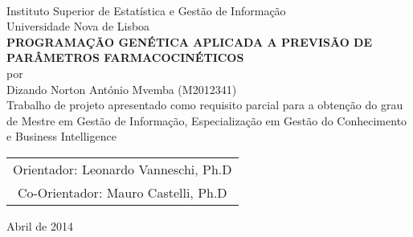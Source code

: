\setcounter{page}{1} 


\thispagestyle{empty}
~\\ \vspace{5mm}
\begin{centering}
\normalsize Instituto Superior de Estatística e Gestão de Informação\\
\normalsize Universidade Nova de Lisboa
\\ \vspace{30mm}
\large \textbf{PROGRAMAÇÃO GENÉTICA APLICADA A PREVISÃO DE PARÂMETROS FARMACOCINÉTICOS}
\\ \vspace{10mm}
\normalsize por
\\ \vspace{10mm}
\large Dizando Norton António Mvemba (M2012341) %
\\ \vspace{30mm}
\normalsize Trabalho de projeto apresentado como requisito parcial para a obtenção do grau de Mestre em Gestão de Informação, 
Especialização em Gestão do Conhecimento e Business Intelligence
\\ \vspace{30mm}

\begin{tabular}{c}
\setstretch{1.5}
\normalsize{Orientador: Leonardo Vanneschi, Ph.D} \\
\normalsize{Co-Orientador: Mauro Castelli, Ph.D} \\
\end{tabular}
 
\vspace{25mm}

\normalsize Abril de 2014 \\
\end{centering}
\let\thepage\relax
\pagebreak


